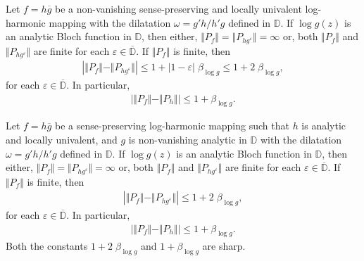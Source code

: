 \documentclass[10pt,a4paper]{amsart}
\newcommand{\beas}{\begin{eqnarray*}}
\newcommand{\eeas}{\end{eqnarray*}}
\newcommand{\ol}{\overline}
\renewcommand{\epsilon}{\varepsilon}
\begin{document}
\begin{thm}\label{Th1}
Let $f=h\overline{g}$ be a non-vanishing sense-preserving and locally univalent log-harmonic mapping with the dilatation $\omega=g'h/h'g$ defined in $\mathbb{D}$. If $\log{g(z)}$ is an analytic Bloch function in $\mathbb{D}$, then either, $\Vert P_f \Vert =\Vert P_{hg^{\epsilon}}\Vert =\infty$ or, both $\Vert P_f \Vert $ and $\Vert P_{hg^{\epsilon}}\Vert $ are finite for each $\epsilon\in\ol{\mathbb{D}}$. If $\Vert P_f \Vert $ is finite, then
\beas
\left|\Vert P_f \Vert -\Vert P_{hg^{\epsilon}}\Vert \right|\leq 1+|1-\epsilon|\;\beta_{\log{g}}\leq 1+2\;\beta_{\log{g}},
\eeas
for each $\epsilon\in\ol{\mathbb{D}}$. 
In particular,
\beas
\left|\Vert P_f \Vert -\Vert P_{h}\Vert \right|\leq 1+\beta_{\log{g}}.\eeas
\end{thm}

\begin{thm}\label{Th11}
Let $f=h\overline{g}$ be a sense-preserving log-harmonic mapping such that $h$ is analytic and locally univalent, and $g$ is non-vanishing analytic in $\mathbb{D}$ with the dilatation $\omega=g'h/h'g$ defined in $\mathbb{D}$. If $\log{g(z)}$ is an analytic Bloch function in $\mathbb{D}$, then either, $\Vert P_f \Vert =\Vert P_{hg^{\epsilon}}\Vert =\infty$ or, both $\Vert P_f \Vert $ and $\Vert P_{hg^{\epsilon}}\Vert $ are finite for each $\epsilon\in\ol{\mathbb{D}}$. If $\Vert P_f \Vert $ is finite, then
\beas
\left|\Vert P_f \Vert -\Vert P_{hg^{\epsilon}}\Vert \right|\leq 1+2\;\beta_{\log{g}},
\eeas
for each $\epsilon\in\ol{\mathbb{D}}$. 
In particular,
\beas
\left|\Vert P_f \Vert -\Vert P_{h}\Vert \right|\leq 1+\beta_{\log{g}}.\eeas
Both the constants $ 1+2\;\beta_{\log{g}}$ and $1+\beta_{\log{g}}$ are sharp.
\end{thm}
\end{document}
